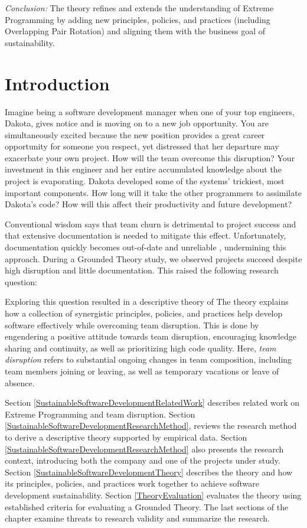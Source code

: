 \textit{Conclusion:} The theory refines and extends the understanding of Extreme Programming by adding new principles, policies, and practices (including Overlapping Pair Rotation) and aligning them with the business goal of sustainability. 

\section{Introduction}
Imagine being a software development manager when one of your top engineers, Dakota, gives notice and is moving on to a new job opportunity. You are simultaneously excited because the new position provides a great career opportunity for someone you respect, yet distressed that her departure may exacerbate your own project. How will the team overcome this disruption? Your investment in this engineer and her entire accumulated knowledge about the project is evaporating. Dakota developed some of the systems' trickiest, most important components. How long will it take the other programmers to assimilate Dakota's code?  How will this affect their productivity and future development?


Conventional wisdom says that team churn is detrimental to project success and that extensive documentation is needed to mitigate this effect. Unfortunately, documentation quickly becomes out-of-date and unreliable \cite{Lethbridge2003Documentation}, undermining this approach. During a Grounded Theory study, we observed projects succeed despite high disruption and little documentation. This raised the following research question: 

Exploring this question resulted in a descriptive theory of  The theory explains how a collection of synergistic principles, policies, and practices help develop software effectively while overcoming team disruption. This is done by engendering a positive attitude towards team disruption, encouraging knowledge sharing and continuity, as well as prioritizing high code quality. Here, \textit{team disruption} refers to substantial ongoing changes in team composition, including team members joining or leaving, as well as temporary vacations or leave of absence. 

Section \ref{SustainableSoftwareDevelopmentRelatedWork} describes related work on Extreme Programming and team disruption. Section \ref{SustainableSoftwareDevelopmentResearchMethod}, reviews the research method to derive a descriptive theory supported by empirical data. Section \ref{SustainableSoftwareDevelopmentResearchMethod} also presents the research context, introducing both the company and one of the \numberOfObservedProjects{} projects under study. Section \ref{SustainableSoftwareDevelopmentTheory} describes the theory and how its principles, policies, and practices work together to achieve software development sustainability. Section \ref{TheoryEvaluation} evaluates the theory using established criteria for evaluating a Grounded Theory. The last sections of the chapter examine threats to research validity and summarize the research.

